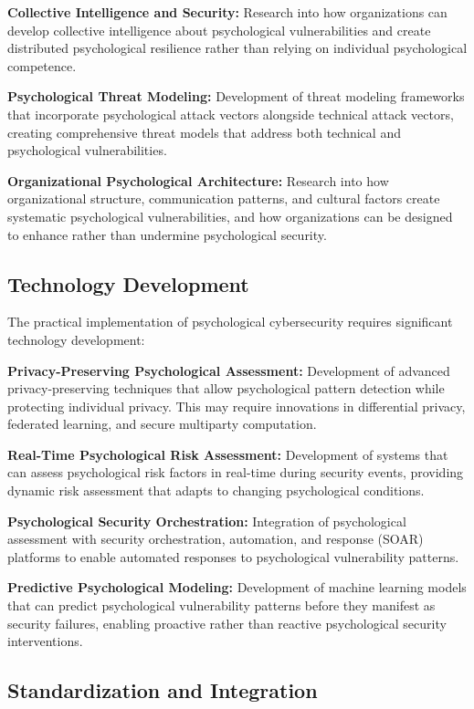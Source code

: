\documentclass[10pt, twocolumn]{article}
\begin{document}
\textbf{Collective Intelligence and Security:} Research into how organizations can develop collective intelligence about psychological vulnerabilities and create distributed psychological resilience rather than relying on individual psychological competence.

\textbf{Psychological Threat Modeling:} Development of threat modeling frameworks that incorporate psychological attack vectors alongside technical attack vectors, creating comprehensive threat models that address both technical and psychological vulnerabilities.

\textbf{Organizational Psychological Architecture:} Research into how organizational structure, communication patterns, and cultural factors create systematic psychological vulnerabilities, and how organizations can be designed to enhance rather than undermine psychological security.

\subsection{Technology Development}

The practical implementation of psychological cybersecurity requires significant technology development:

\textbf{Privacy-Preserving Psychological Assessment:} Development of advanced privacy-preserving techniques that allow psychological pattern detection while protecting individual privacy. This may require innovations in differential privacy, federated learning, and secure multiparty computation.

\textbf{Real-Time Psychological Risk Assessment:} Development of systems that can assess psychological risk factors in real-time during security events, providing dynamic risk assessment that adapts to changing psychological conditions.

\textbf{Psychological Security Orchestration:} Integration of psychological assessment with security orchestration, automation, and response (SOAR) platforms to enable automated responses to psychological vulnerability patterns.

\textbf{Predictive Psychological Modeling:} Development of machine learning models that can predict psychological vulnerability patterns before they manifest as security failures, enabling proactive rather than reactive psychological security interventions.

\subsection{Standardization and Integration}
\end{document}
